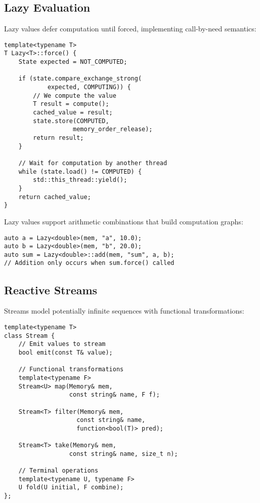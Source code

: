 \documentclass[10pt,conference]{IEEEtran}
\begin{document}
\subsection{Lazy Evaluation}

Lazy values defer computation until forced, implementing call-by-need semantics:

\begin{lstlisting}[caption={Lazy Computation},label={lst:lazy}]
template<typename T>
T Lazy<T>::force() {
    State expected = NOT_COMPUTED;
    
    if (state.compare_exchange_strong(
            expected, COMPUTING)) {
        // We compute the value
        T result = compute();
        cached_value = result;
        state.store(COMPUTED, 
                   memory_order_release);
        return result;
    }
    
    // Wait for computation by another thread
    while (state.load() != COMPUTED) {
        std::this_thread::yield();
    }
    return cached_value;
}
\end{lstlisting}

Lazy values support arithmetic combinations that build computation graphs:

\begin{lstlisting}[caption={Lazy Arithmetic},label={lst:lazymath}]
auto a = Lazy<double>(mem, "a", 10.0);
auto b = Lazy<double>(mem, "b", 20.0);
auto sum = Lazy<double>::add(mem, "sum", a, b);
// Addition only occurs when sum.force() called
\end{lstlisting}

\subsection{Reactive Streams}

Streams model potentially infinite sequences with functional transformations:

\begin{lstlisting}[caption={Stream Operations},label={lst:stream}]
template<typename T>
class Stream {
    // Emit values to stream
    bool emit(const T& value);
    
    // Functional transformations
    template<typename F>
    Stream<U> map(Memory& mem, 
                  const string& name, F f);
    
    Stream<T> filter(Memory& mem,
                    const string& name,
                    function<bool(T)> pred);
    
    Stream<T> take(Memory& mem, 
                  const string& name, size_t n);
    
    // Terminal operations
    template<typename U, typename F>
    U fold(U initial, F combine);
};
\end{lstlisting}
\end{document}
